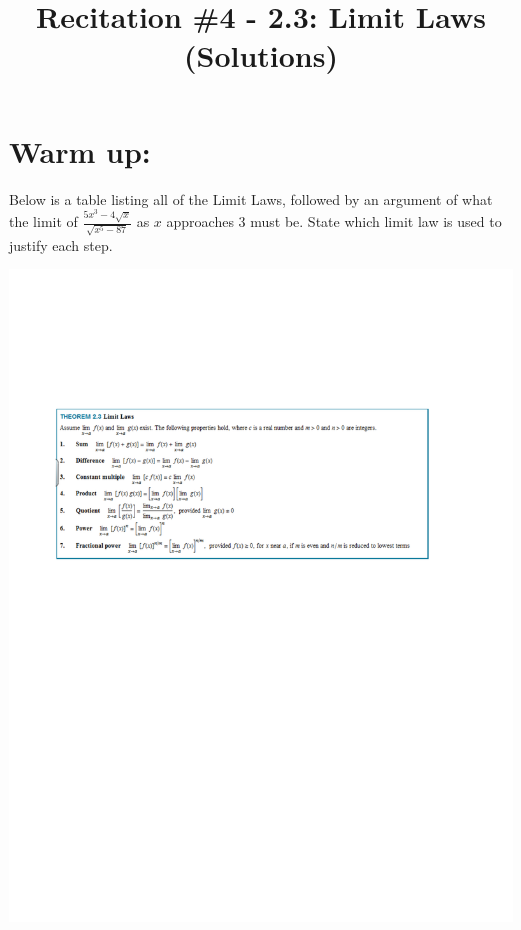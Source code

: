 \documentclass[nooutcomes]{ximera}
\title{Recitation \#4 - 2.3:  Limit Laws (Solutions)}
\begin{document}
\begin{abstract}		\end{abstract}
\maketitle

\section*{Warm up:} 
Below is a table listing all of the Limit Laws, followed by an argument of what the limit of $ \frac{5x^3 - 4 \sqrt{x}}{\sqrt{x^5 - 87}}  $ as $x$ approaches 3 must be.  State which limit law is used to justify each step.

	\begin{image}
	\includegraphics[trim= 250 440 300 175]{Figure1.pdf}
	\end{image}
\end{document}
